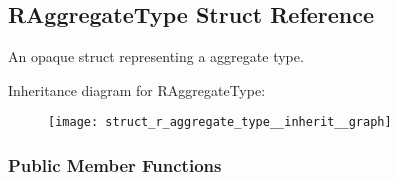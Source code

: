 \hypertarget{struct_r_aggregate_type}{\subsection{R\-Aggregate\-Type Struct Reference}
\label{struct_r_aggregate_type}
}


An opaque struct representing a aggregate type.  




Inheritance diagram for R\-Aggregate\-Type\-:\nopagebreak
\begin{figure}[H]
\begin{center}
\leavevmode
\texttt{[image: struct\_r\_aggregate\_type\_\_inherit\_\_graph]}
\end{center}
\end{figure}
\subsubsection*{Public Member Functions}
